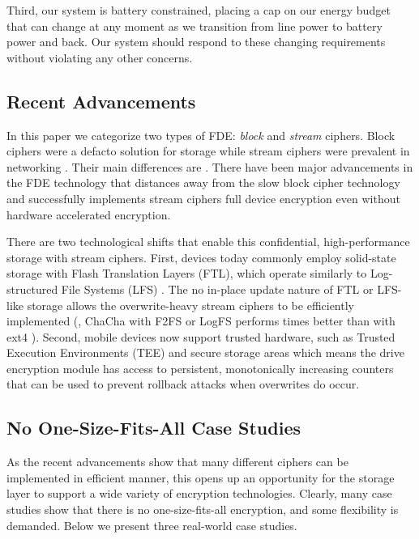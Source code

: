 Third, our system is battery constrained, placing a cap on our energy budget
that can change at any moment as we transition from line power to battery power
and back. Our system should respond to these changing requirements without
violating any other concerns.


\subsection{Recent Advancements}

In this paper we categorize two types of FDE: {\em block} and {\em stream}
ciphers. Block ciphers were a defacto solution for storage while stream ciphers
were prevalent in networking . Their main differences are . There have been major advancements in the FDE
technology that distances away from the slow block cipher technology and
successfully implements stream ciphers full device encryption \cite{Adiantum,
StrongBox} even without hardware accelerated encryption.


There are two technological shifts that enable this confidential,
high-performance storage with stream ciphers. First, devices today commonly
employ solid-state storage with Flash Translation Layers (FTL), which operate
similarly to Log-structured File Systems (LFS) \cite{21, 22, 27-fromStrongBox}.
The no in-place update nature of FTL or LFS-like storage allows the
overwrite-heavy stream ciphers to be efficiently implemented (\eg, ChaCha with
F2FS or LogFS performs \xxx times better than with ext4 \cite{StrongBox}).
Second, mobile devices now support trusted hardware, such as Trusted Execution
Environments (TEE) \cite{24, 29-fromStrongBox} and secure storage areas
\cite{10-fromStrongBox} which means the drive encryption module has access to
persistent, monotonically increasing counters that can be used to prevent
rollback attacks when overwrites do occur.


\subsection{No One-Size-Fits-All Case Studies}

As the recent advancements show that many different ciphers can be implemented
in efficient manner, this opens up an opportunity for the storage layer to
support a wide variety of encryption technologies. Clearly, many case studies
show that there is no one-size-fits-all encryption, and some flexibility is
demanded. Below we present three real-world case studies.

